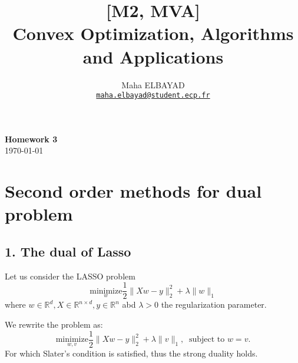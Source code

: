 \documentclass[11pt]{article}
\title{[M2, MVA]\\ Convex Optimization, Algorithms and Applications}
\author{Maha ELBAYAD\\ \href{mailto:maha.elbayad@student.ecp.fr}{\tt maha.elbayad@student.ecp.fr}}
\date{}
\theoremstyle{exo}
\newcommand{\R}{\mathbb{R}}
\newcommand{\1}{\mathbf{1}}
\newcommand{\0}{\mathbf{0}}
\begin{document}
\maketitle
\vspace{-10pt}
\begin{center}
{\huge \bf Homework 3}\\
\today
\vspace{15pt}
\end{center}

\vspace{10pt}

\section{Second order methods for dual problem}
\subsection*{1. The dual of Lasso}
Let us consider the LASSO problem
\begin{equation}
\tag{LASSO}
\label{lasso}
\underset{w}{\text{minimize}} \frac{1}{2}\|Xw-y\|_2^2+\lambda\|w\|_1
\end{equation}
where $w\in\R^d,X\in\R^{n\times d},y\in\R^n$ abd $\lambda>0$ the regularization parameter.

We rewrite the problem as:
\[\underset{w,v}{\text{minimize}} \frac{1}{2}\|Xw-y\|_2^2+\lambda\|v\|_1,\:\text{ subject to }w=v.\]
For which Slater's condition is satisfied, thus the strong duality holds.
\end{document}
